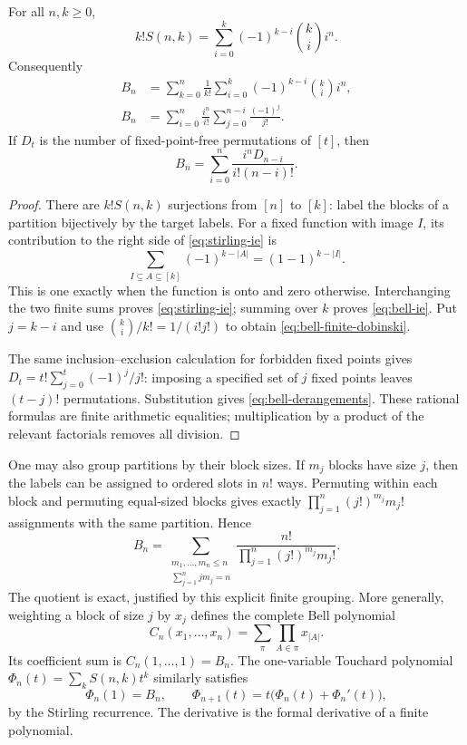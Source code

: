 \begin{theorem}
\label{thm:finite-dobinski}
For all $n,k\geq0$,
\begin{equation}\label{eq:stirling-ie}
 k!S(n,k)=\sum_{i=0}^{k}(-1)^{k-i}\binom ki i^n.
\end{equation}
Consequently
\begin{align}
 B_n&=\sum_{k=0}^{n}\frac1{k!}
        \sum_{i=0}^{k}(-1)^{k-i}\binom ki i^n,\label{eq:bell-ie}\\
 B_n&=\sum_{i=0}^{n}\frac{i^n}{i!}
        \sum_{j=0}^{n-i}\frac{(-1)^j}{j!}.\label{eq:bell-finite-dobinski}
\end{align}
If $D_t$ is the number of fixed-point-free permutations of $[t]$, then
\begin{equation}\label{eq:bell-derangements}
  B_n=\sum_{i=0}^{n}\frac{i^nD_{n-i}}{i!(n-i)!}.
\end{equation}
\end{theorem}
\begin{proof}
There are $k!S(n,k)$ surjections from $[n]$ to $[k]$: label the blocks of a
partition bijectively by the target labels. For a fixed function with image
$I$, its contribution to the right side of \eqref{eq:stirling-ie} is
\[
 \sum_{I\subseteq A\subseteq[k]}(-1)^{k-|A|}
       =(1-1)^{k-|I|}.
\]
This is one exactly when the function is onto and zero otherwise. Interchanging
the two finite sums proves \eqref{eq:stirling-ie}; summing over $k$ proves
\eqref{eq:bell-ie}. Put $j=k-i$ and use
$\binom ki/k!=1/(i!j!)$ to obtain
\eqref{eq:bell-finite-dobinski}.

The same inclusion--exclusion calculation for forbidden fixed points gives
$D_t=t!\sum_{j=0}^{t}(-1)^j/j!$: imposing a specified set of $j$ fixed points
leaves $(t-j)!$ permutations. Substitution gives
\eqref{eq:bell-derangements}. These rational formulas are finite arithmetic
equalities; multiplication by a product of the relevant factorials removes
all division.
\end{proof}

One may also group partitions by their block sizes. If $m_j$ blocks have size
$j$, then the labels can be assigned to ordered slots in $n!$ ways. Permuting
within each block and permuting equal-sized blocks gives exactly
$\prod_{j=1}^{n}(j!)^{m_j}m_j!$ assignments with the same partition. Hence
\begin{equation}\label{eq:block-profile}
 B_n=\sum_{\substack{m_1,\ldots,m_n\leq n\\\sum_{j=1}^n jm_j=n}}
       \frac{n!}{\prod_{j=1}^{n}(j!)^{m_j}m_j!}.
\end{equation}
The quotient is exact, justified by this explicit finite grouping. More
generally, weighting a block of size $j$ by $x_j$ defines the complete Bell
polynomial
\[
 C_n(x_1,\ldots,x_n)=\sum_{\pi}\prod_{A\in\pi}x_{|A|}.
\]
Its coefficient sum is $C_n(1,\ldots,1)=B_n$.
The one-variable Touchard polynomial
$\Phi_n(t)=\sum_kS(n,k)t^k$ similarly satisfies
\[
 \Phi_n(1)=B_n,\qquad
 \Phi_{n+1}(t)=t\bigl(\Phi_n(t)+\Phi_n'(t)\bigr),
\]
by the Stirling recurrence. The derivative is the formal derivative of a
finite polynomial.

